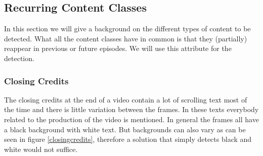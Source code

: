 \documentclass{article}
\begin{document}
\subsection{Recurring Content Classes} \label{section:segmentclasses}
In this section we will give a background on the different types of content to be detected. What all the content classes have in common is that they (partially) reappear in previous or future episodes. We will use this attribute for the detection. 

\subsubsection{Closing Credits}
The closing credits at the end of a video contain a lot of scrolling text most of the time and there is little variation between the frames. In these texts everybody related to the production of the video is mentioned. In general the frames all have a black background with white text. But backgrounds can also vary as can be seen in figure \ref{closingcredits}, therefore a solution that simply detects black and white would not suffice.
\end{document}
